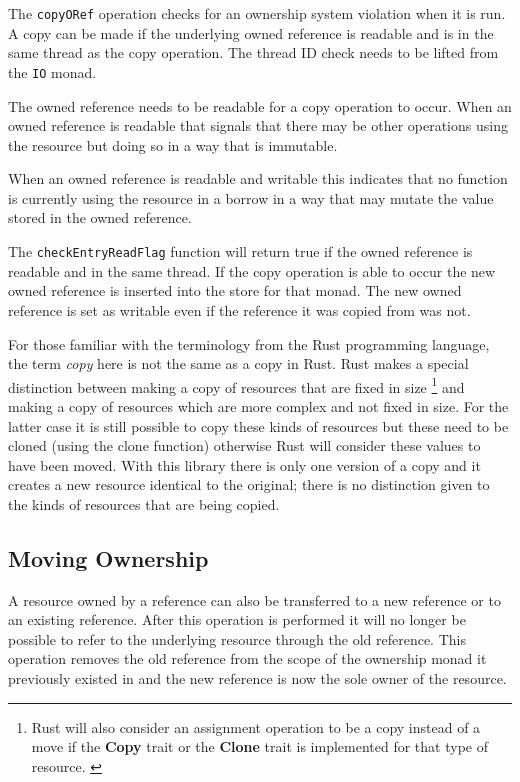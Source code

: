 \documentclass[onehalf,11pt]{beavtex}
\begin{document}
The \texttt{copyORef} operation checks for an ownership system violation when
it is run.  A copy can be made if the underlying owned reference is readable
and is in the same thread as the copy operation.
The thread ID check needs to be lifted from the \texttt{IO} monad.

The owned reference needs to be readable for a copy operation to occur.
When an owned reference is readable that signals that there may be other
operations using the resource but doing so in a way that is immutable.

When an owned reference is readable and writable this indicates that no function
is currently using the resource in a borrow in a way that may mutate the value
stored in the owned reference.

The \texttt{checkEntryReadFlag} function will return true if the owned reference
is readable and in the same thread.
If the copy operation is able to occur the new owned reference is inserted into
the store for that monad. The new owned reference is set as writable even if
the reference it was copied from was not.

For those familiar with the terminology from the Rust programming language, the
term \textit{copy} here is not the same as a copy in Rust. Rust makes a special
distinction between making a copy of resources that are fixed in size
\footnote{Rust will also consider an assignment operation to be a copy instead
  of a move if the \textbf{Copy} trait or the \textbf{Clone} trait is
  implemented for that type of resource. \cite{rust_book_traits}
  \cite{rust_docs_clone_trait}}
and making a copy of resources which are more complex and not fixed in size.
For the latter case it is still possible to copy these kinds of resources but these
need to be cloned (using the clone function) otherwise Rust will consider these
values to have been moved. \cite{rust_book_ownership}
With this library there is only one version of a copy and it creates a new
resource identical to the original; there is no distinction given to the kinds
of resources that are being copied.

\subsection{Moving Ownership}

A resource owned by a reference can also be transferred to a new reference or
to an existing reference. After this operation is performed it will no longer
be possible to refer to the underlying resource through the old reference. This
operation removes the old reference from the scope of the ownership monad it
previously existed in and the new reference is now the sole owner of the
resource.
\end{document}
